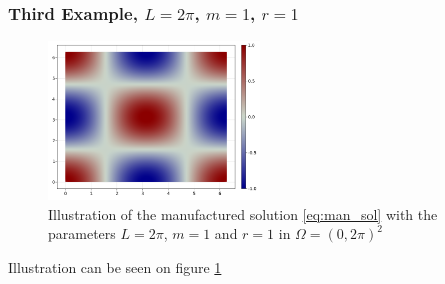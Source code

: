 \subsubsection{Third Example, $L=2 \pi $, $m=1$, $r=1$}%
\label{sub:first_example}
\begin{figure}[tbh!]
    \centering
    \includegraphics[width=0.5\textwidth]{figures/model/l_6.28_m_1_r_1n_100_sol.png}
    \caption{Illustration of the manufactured solution \eqref{eq:man_sol}   with the parameters $L=2\pi$, $m=1$ and $r=1$ in $\Omega = (0,2\pi)^2$}
    \label{fig:sol_l2pi_m1_r1}
\end{figure}

Illustration can be seen on figure \ref{fig:sol_l2pi_m1_r1}








